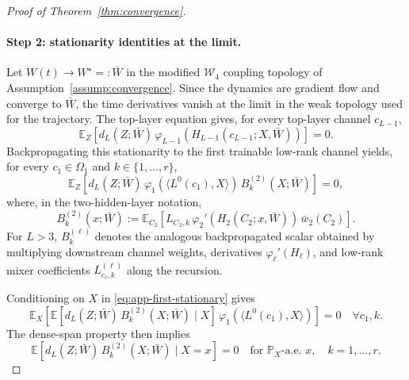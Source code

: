 \documentclass{article}
\newcommand{\E}{\mathbb{E}}
\newcommand{\Pp}{\mathbb{P}}
\begin{document}
\begin{proof}[Proof of Theorem~\ref{thm:convergence}]
\paragraph{Step 2: stationarity identities at the limit.}
Let $W(t)\to W^\star=:\bar W$ in the modified $\mathcal W_4$ coupling topology of Assumption~\ref{assump:convergence}. Since the dynamics are gradient flow and converge to $\bar W$, the time derivatives vanish at the limit in the weak topology used for the trajectory. The top-layer equation gives, for every top-layer channel $c_{L-1}$,
\begin{equation}
\E_Z\!\left[
d_L(Z;\bar W)\,
\varphi_{L-1}(H_{L-1}(c_{L-1};X,\bar W))
\right]=0.
\end{equation}
Backpropagating this stationarity to the first trainable low-rank channel yields, for every $c_1\in\Omega_1$ and $k\in\{1,\ldots,r\}$,
\begin{equation}
\E_Z\!\left[
d_L(Z;\bar W)\,
\varphi_1(\langle L^0(c_1),X\rangle)\,
B_k^{(2)}(X;\bar W)
\right]=0,
\label{eq:app-first-stationary}
\end{equation}
where, in the two-hidden-layer notation,
\begin{equation}
B_k^{(2)}(x;\bar W)
:=
\E_{C_2}\!\left[
L_{C_2,k}\,
\varphi_2'(H_2(C_2;x,\bar W))\,
\bar w_2(C_2)
\right].
\label{eq:app-Bk}
\end{equation}
For $L>3$, $B_k^{(\ell)}$ denotes the analogous backpropagated scalar obtained by multiplying downstream channel weights, derivatives $\varphi_\ell'(H_\ell)$, and low-rank mixer coefficients $L^{(\ell)}_{c_\ell,k}$ along the recursion.

Conditioning on $X$ in \eqref{eq:app-first-stationary} gives
\begin{equation}
\E_X\!\left[
\E\!\left[
d_L(Z;\bar W)\,
B_k^{(2)}(X;\bar W)
\mid X
\right]\,
\varphi_1(\langle L^0(c_1),X\rangle)
\right]=0
\quad\forall c_1,k.
\end{equation}
The dense-span property then implies
\begin{equation}
\E\!\left[
d_L(Z;\bar W)\,
B_k^{(2)}(X;\bar W)
\mid X=x
\right]=0
\quad\text{for }\Pp_X\text{-a.e. }x,\quad k=1,\ldots,r.
\label{eq:app-dense-product}
\end{equation}


\end{proof}
\end{document}
